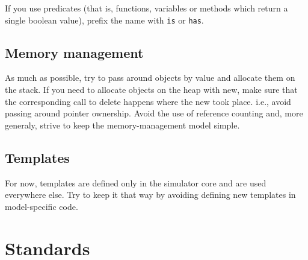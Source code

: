 \documentclass[11pt]{article}
\newcommand{\code}[1]{\texttt{#1}}
\begin{document}
If you use predicates (that is, functions, variables or methods
which return a single boolean value), prefix the 
name with \code{is} or \code{has}.

\subsection{Memory management}

As much as possible, try to pass around objects
by value and allocate them on the stack. If you need to allocate
objects on the heap with new, make sure that the corresponding
call to delete happens where the new took place. i.e., avoid
passing around pointer ownership.
Avoid the use of reference counting and, more generaly, strive to
keep the memory-management model simple.

\subsection{Templates}

For now, templates are defined only in the simulator
core and are used everywhere else. Try to keep it that way by 
avoiding defining new templates in model-specific code.


\section{Standards}
\end{document}
